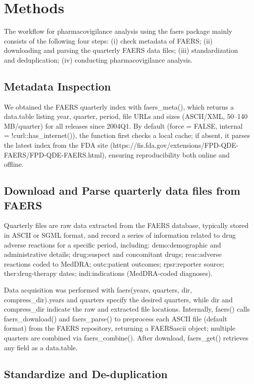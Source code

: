 \documentclass{bioinfo}
\begin{document}
\section{Methods}

The workflow for pharmacovigilance analysis using the faers package
mainly consists of the following four steps: (i) check metadata of
FAERS; (ii) downloading and parsing the quarterly FAERS data files;
(iii) standardization and deduplication; (iv) conducting
pharmacovigilance analysis.

\subsection{Metadata Inspection}

We obtained the FAERS quarterly index with faers\_meta(), which returns
a data.table listing year, quarter, period, file URLs and sizes
(ASCII/XML, 50--140 MB/quarter) for all releases since 2004Q1. By
default (force = FALSE, internal = !curl::has\_internet()), the function
first checks a local cache; if absent, it parses the latest index from
the FDA site
(https://fis.fda.gov/extensions/FPD-QDE-FAERS/FPD-QDE-FAERS.html),
ensuring reproducibility both online and offline.

\subsection{Download and Parse quarterly data files from FAERS}

Quarterly files are raw data extracted from the FAERS database,
typically stored in ASCII or SGML format, and record a series of
information related to drug adverse reactions for a specific period,
including: demo:demographic and administrative details; drug:suspect and
concomitant drugs; reac:adverse reactions coded to MedDRA; outc:patient
outcomes; rpsr:reporter source; ther:drug-therapy dates;
indi:indications (MedDRA-coded diagnoses).

Data acquisition was performed with faers(years, quarters, dir,
compress\_dir).years and quarters specify the desired quarters, while
dir and compress\_dir indicate the raw and extracted file locations.
Internally, faers() calls faers\_download() and faers\_parse() to
preprocess each ASCII file (default format) from the FAERS repository,
returning a FAERSascii object; multiple quarters are combined via
faers\_combine(). After download, faers\_get() retrieves any field as a
data.table.

\subsection{Standardize and De-duplication}
\end{document}
